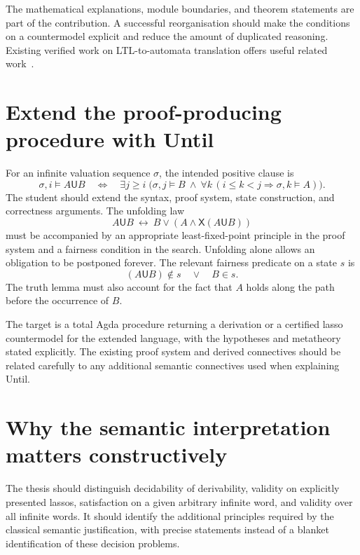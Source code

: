 \documentclass[11pt,a4paper]{article}
\newcommand{\Next}{\mathsf{X}}
\newcommand{\Until}{\mathbin{\mathsf{U}}}
\begin{document}
The mathematical explanations, module boundaries, and theorem statements
are part of the contribution. A successful reorganisation should make the
conditions on a countermodel explicit and reduce the amount of duplicated
reasoning. Existing verified work on LTL-to-automata translation offers
useful related work~\cite{schimpf}.

\section{Extend the proof-producing procedure with Until}

For an infinite valuation sequence $\sigma$, the intended positive clause is
\[
 \sigma,i\models A\Until B
 \quad\Longleftrightarrow\quad
 \exists j\geq i\;
 \bigl(\sigma,j\models B\ \land\
       \forall k\,(i\leq k<j\Rightarrow\sigma,k\models A)\bigr).
\]
The student should extend the syntax, proof system, state construction,
and correctness arguments. The unfolding law
\[
 A\Until B\ \leftrightarrow\ B\lor(A\land\Next(A\Until B))
\]
must be accompanied by an appropriate least-fixed-point principle in
the proof system and a fairness condition in the search. Unfolding alone
allows an obligation to be postponed forever. The relevant fairness
predicate on a state $s$ is
\[
 (A\Until B)\notin s\quad\lor\quad B\in s.
\]
The truth lemma must also account for the fact that $A$ holds along the
path before the occurrence of $B$.

The target is a total Agda procedure returning a derivation or a certified
lasso countermodel for the extended language, with the hypotheses and
metatheory stated explicitly. The existing proof system and derived
connectives should be related carefully to any additional semantic
connectives used when explaining Until.

\section{Why the semantic interpretation matters constructively}

The thesis should distinguish decidability of derivability, validity on
explicitly presented lassos, satisfaction on a given arbitrary infinite
word, and validity over all infinite words. It should identify the
additional principles required by the classical semantic justification,
with precise statements instead of a blanket identification of these
decision problems.
\end{document}
